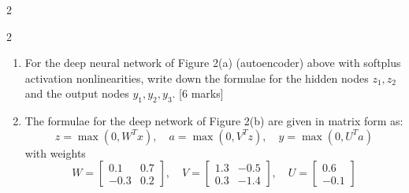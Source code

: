 \begin{multicols}{2}
\end{multicols}{2}



\begin{enumerate}[label=(\alph*)]
    \item For the deep neural network of Figure 2(a) (autoencoder) above with softplus activation nonlinearities, write down the formulae for the hidden nodes $z_1, z_2$ and the output nodes $y_1, y_2, y_3$. \hfill [6 marks]

    \item The formulae for the deep network of Figure 2(b) are given in matrix form as:
    \[
    z = \max(0, W^T x), \quad a = \max(0, V^T z), \quad y = \max(0, U^T a)
    \]
    with weights
    \[
    W = \begin{bmatrix}
    0.1 & 0.7 \\
    -0.3 & 0.2
    \end{bmatrix}, \quad
    V = \begin{bmatrix}
    1.3 & -0.5 \\
    0.3 & -1.4
    \end{bmatrix}, \quad
    U = \begin{bmatrix}
    0.6 \\
    -0.1
    \end{bmatrix}
    \]


\end{enumerate}

